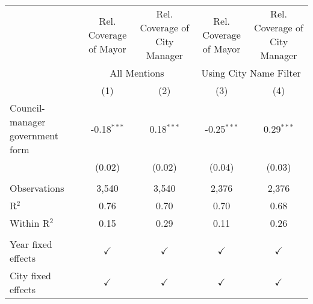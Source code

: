 \begingroup
\centering
\begin{tabular}{lcccc}
   \toprule
                                   & Rel. Coverage of Mayor & Rel. Coverage of City Manager & Rel. Coverage of Mayor & Rel. Coverage of City Manager\\  
    & \multicolumn{2}{c}{All Mentions} & \multicolumn{2}{c}{Using City Name Filter} \\ \cmidrule(lr){2-3} \cmidrule(lr){4-5}
                                   & (1)                    & (2)                           & (3)                    & (4)\\  
   \midrule 
   Council-manager government form & -0.18$^{***}$          & 0.18$^{***}$                  & -0.25$^{***}$          & 0.29$^{***}$\\   
                                   & (0.02)                 & (0.02)                        & (0.04)                 & (0.03)\\   
    \\
   Observations                    & 3,540                  & 3,540                         & 2,376                  & 2,376\\  
   R$^2$                           & 0.76                   & 0.70                          & 0.70                   & 0.68\\  
   Within R$^2$                    & 0.15                   & 0.29                          & 0.11                   & 0.26\\  
    \\
   Year fixed effects              & $\checkmark$           & $\checkmark$                  & $\checkmark$           & $\checkmark$\\   
   City fixed effects              & $\checkmark$           & $\checkmark$                  & $\checkmark$           & $\checkmark$\\   
   \bottomrule
\end{tabular}
\par\endgroup
